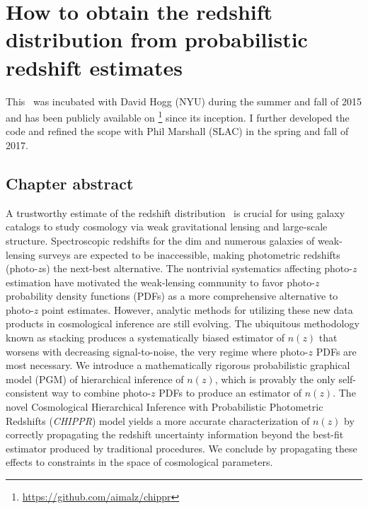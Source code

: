 \renewcommand{\chapid}{chippr}

\newcommand{\Chippr}{\textit{CHIPPR}}
\newcommand{\cosmolike}{\repo{CosmoLike}}
\newcommand{\emcee}{\repo{emcee}}
\newcommand{\boss}{\project{BOSS}}
\newcommand{\mmle}{marginalized maximum likelihood estimate}%


\chapter{ How to obtain the redshift distribution from probabilistic redshift estimates  }

This \paper\ was incubated with David Hogg (NYU) during the summer and fall of 2015 and has been publicly available on \github\footnote{\url{https://github.com/aimalz/chippr}} since its inception.
I further developed the code and refined the scope with Phil Marshall (SLAC) in the spring and fall of 2017.

\section*{Chapter abstract}

A trustworthy estimate of the redshift distribution \nz\ is crucial for using galaxy catalogs to study cosmology via weak gravitational lensing and large-scale structure.
Spectroscopic redshifts for the dim and numerous galaxies of weak-lensing surveys are expected to be inaccessible, making photometric redshifts (photo-$z$s) the next-best alternative.
The nontrivial systematics affecting photo-$z$ estimation have motivated the weak-lensing community to favor photo-$z$ probability density functions (PDFs) as a more comprehensive alternative to photo-$z$ point estimates.
However, analytic methods for utilizing these new data products in cosmological inference are still evolving.
The ubiquitous methodology known as stacking produces a systematically biased estimator of $n(z)$ that worsens with decreasing signal-to-noise, the very regime where photo-$z$ PDFs are most necessary.
We introduce a mathematically rigorous probabilistic graphical model (PGM) of hierarchical inference of $n(z)$, which is provably the only self-consistent way to combine photo-$z$ PDFs to produce an estimator of $n(z)$.
The novel Cosmological Hierarchical Inference with Probabilistic Photometric Redshifts (\Chippr) model yields a more accurate characterization of $n(z)$ by correctly propagating the redshift uncertainty information beyond the best-fit estimator produced by traditional procedures.
We conclude by propagating these effects to constraints in the space of cosmological parameters.

